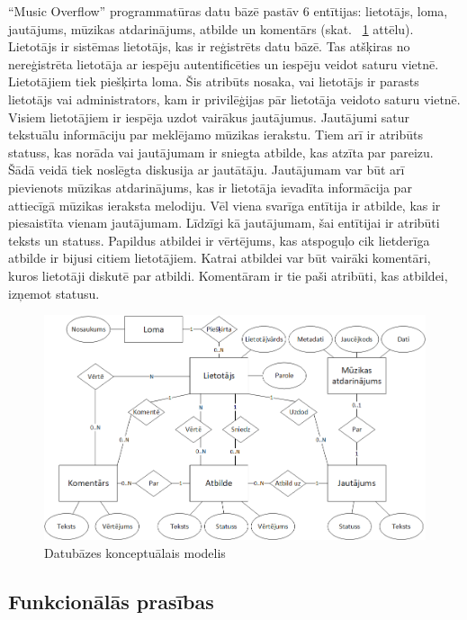 \documentclass[12pt]{article}
\begin{document}
``Music Overflow'' programmatūras datu bāzē pastāv 6 entītijas: lietotājs, loma, jautājums, mūzikas
atdarinājums, atbilde un komentārs (skat. ~\ref{fig:db_konceptualais} attēlu). Lietotājs ir sistēmas lietotājs, kas ir reģistrēts datu bāzē. Tas
atšķiras no nereģistrēta lietotāja ar iespēju autentificēties un iespēju veidot saturu vietnē.
Lietotājiem tiek piešķirta loma. Šis atribūts nosaka, vai lietotājs ir parasts lietotājs vai administrators,
kam ir privilēģijas pār lietotāja veidoto saturu vietnē. Visiem lietotājiem ir iespēja uzdot vairākus
jautājumus. Jautājumi satur tekstuālu informāciju par meklējamo mūzikas ierakstu. Tiem arī ir
atribūts statuss, kas norāda vai jautājumam ir sniegta atbilde, kas atzīta par pareizu. Šādā veidā tiek
noslēgta diskusija ar jautātāju. Jautājumam var būt arī pievienots mūzikas atdarinājums, kas ir
lietotāja ievadīta informācija par attiecīgā mūzikas ieraksta melodiju. Vēl viena svarīga entītija ir
atbilde, kas ir piesaistīta vienam jautājumam. Līdzīgi kā jautājumam, šai entītijai ir atribūti teksts un
statuss. Papildus atbildei ir vērtējums, kas atspoguļo cik lietderīga atbilde ir bijusi citiem
lietotājiem. Katrai atbildei var būt vairāki komentāri, kuros lietotāji diskutē par atbildi. Komentāram
ir tie paši atribūti, kas atbildei, izņemot statusu.

\begin{figure}[H]
\begin{center}
	\includegraphics[scale=0.5]{DB_concept.png}
	\caption{Datubāzes konceptuālais modelis}
	\label{fig:db_konceptualais}
\end{center}
\end{figure}

\subsection{Funkcionālās prasības}
\end{document}
